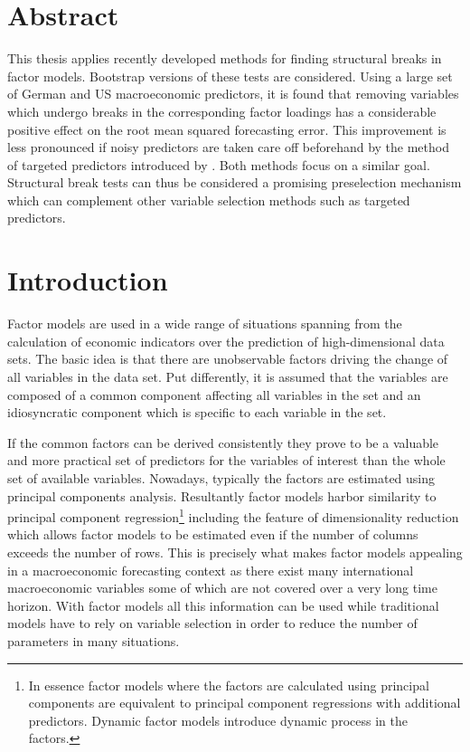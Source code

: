 \documentclass[12pt]{article}
\begin{document}
\section*{Abstract}
This thesis applies recently developed methods for finding structural breaks in factor models. Bootstrap versions of these tests are considered. Using a large set of German and US macroeconomic predictors, it is found that removing variables which undergo breaks in the corresponding factor loadings has a considerable positive effect on the root mean squared forecasting error. This improvement is less pronounced if noisy predictors are taken care off beforehand by the method of targeted predictors introduced by \citet{bai2008forecasting}. Both methods focus on a similar goal. Structural break tests can thus be considered a promising preselection mechanism which can complement other variable selection methods such as targeted predictors.

\section*{Introduction}
Factor models are used in a wide range of situations spanning from the calculation of economic indicators over the prediction of high-dimensional data sets. The basic idea is that there are unobservable factors driving the change of all variables in the data set. Put differently, it is assumed that the variables are composed of a common component affecting all variables in the set and an idiosyncratic component which is specific to each variable in the set.

If the common factors can be derived consistently they prove to be a valuable and more practical set of predictors for the variables of interest than the whole set of available variables. Nowadays, typically the factors are estimated using principal components analysis. Resultantly factor models harbor similarity to principal component regression\footnote{In essence factor models where the factors are calculated using principal components are equivalent to principal component regressions with additional predictors. Dynamic factor models introduce dynamic process in the factors.} including the feature of dimensionality reduction which allows factor models to be estimated even if the number of columns exceeds the number of rows. This is precisely what makes factor models appealing in a macroeconomic forecasting context as there exist many international macroeconomic variables some of which are not covered over a very long time horizon. With factor models all this information can be used while traditional models have to rely on variable selection in order to reduce the number of parameters in many situations.
\end{document}
